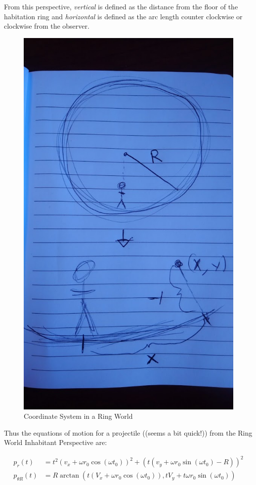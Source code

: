 \documentclass{amsart}
\theoremstyle{definition}
\begin{document}
From this perspective,
\textit{vertical} is defined as the distance from the floor of the
habitation ring and \textit{horizontal} is defined as the arc length
counter clockwise or clockwise from the observer.

\begin{figure}
	\centering
	\includegraphics[width=0.7\linewidth]{figures/coord_syst_intro_rough.JPG}
	\caption{Coordinate System in a Ring World}
	\label{fig:coord_ring}
\end{figure}




Thus the equations of motion for a projectile ((seems a bit quick!))
from the Ring World Inhabitant Perspective are:

\begin{align*}
  p_{r}(t) &= t^2 (v_x + \omega r_0 \cos(\omega t_0))^2 + (t(v_y + \omega
  r_0 \sin(\omega t_0) - R))^2\\
  p_{\theta R}(t) &=R \arctan(t(V_x + \omega r_0 \cos(\omega t_0)),tV_y +
                    t \omega r_0 \sin(\omega t_0))
\end{align*}
\end{document}
